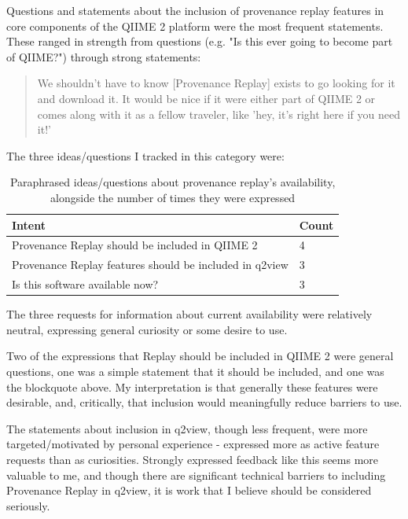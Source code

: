 Questions and statements about the inclusion of provenance replay features in
core components of the QIIME 2 platform were the most frequent statements. These
ranged in strength from questions (e.g. "Is this ever going to become part of
QIIME?") through strong statements:

\begin{quote}
We shouldn't have to know [Provenance Replay] exists to go looking for it and
download it. It would be nice if it were either part of QIIME 2 or comes along
with it as a fellow traveler, like 'hey, it's right here if you need it!'
\end{quote}

\noindent The three ideas/questions I tracked in this category were:

\begin{table}[htp]
    \centering
    \begin{tabular}{|p{}|p{}|}
    \hline
    Intent                                                  & Count \\ \hline
    Provenance Replay should be included in QIIME 2         & 4     \\
    Provenance Replay features should be included in q2view & 3     \\
    Is this software available now?                         & 3     \\ \hline
    \end{tabular}
    \caption[Focus Group discussions of Provenance Replay's inclusion in QIIME 2]%
    {Paraphrased ideas/questions about provenance replay’s availability,
    alongside the number of times they were expressed}
    \label{tab:platform_inclusion}
\end{table}

The three requests for information about current availability were relatively
neutral, expressing general curiosity or some desire to use.

Two of the expressions that Replay should be included in QIIME 2 were general
questions, one was a simple statement that it should be included, and one was
the blockquote above. My interpretation is that generally these features were
desirable, and, critically, that inclusion would meaningfully reduce barriers to
use.

The statements about inclusion in q2view, though less frequent, were more
targeted/motivated by personal experience - expressed more as active feature
requests than as curiosities. Strongly expressed feedback like this seems more
valuable to me, and though there are significant technical barriers to including
Provenance Replay in q2view, it is work that I believe should be considered
seriously. 

